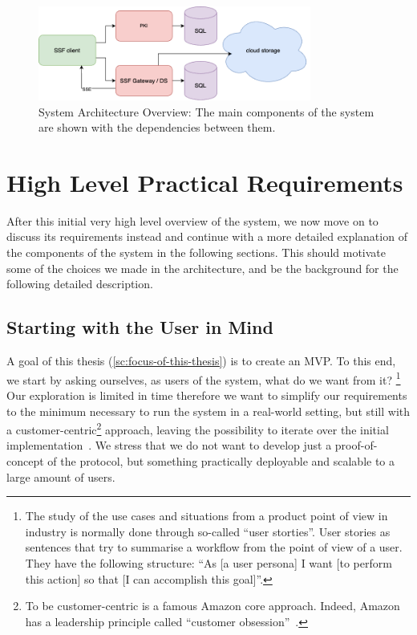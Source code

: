 \begin{figure}
    \centering
    \includegraphics[width=0.8\textwidth]{figures/architecture.png}
    \caption{System Architecture Overview: The main components of the system are shown with the dependencies between them.}
    \label{fig:architecture}
\end{figure}

\section{High Level Practical Requirements}\label{sc:requirements}

After this initial very high level overview of the system, we
now move on to discuss its requirements instead and continue with a more
detailed explanation of the components of the system in the following sections.
This should motivate some of the choices we made in the architecture,
and be the background for the following detailed description.

\subsection{Starting with the User in Mind}\label{sc:real-user}

A goal of this thesis (\cref{sc:focus-of-this-thesis})
is to create an MVP. To this end, we start by asking ourselves,
as users of the system, what do we want from it?
\footnote{The study of the use cases and situations from a product 
point of view in industry is normally done through so-called ``user storties''.
User stories as sentences that try to summarise a workflow from the
point of view of a user. They have the following structure:
``As [a user persona] I want [to perform this action] so that [I can accomplish this goal]''.}
Our exploration is limited in time therefore we want to simplify
our requirements to the minimum necessary to run the system
in a real-world setting, 
but still with a customer-centric\footnote{To be customer-centric is a famous Amazon core approach. Indeed, Amazon has a leadership principle called ``customer obsession''~\cite{AmazonLeadershipPrinciples}.}
approach, leaving the possibility to iterate over the initial implementation~\cite{ries2011startup}.
We stress that we do not want to develop just a proof-of-concept of the protocol,
but something practically deployable and scalable to a large
amount of users.

